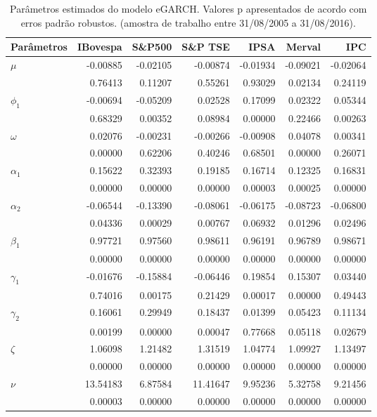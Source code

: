 \begin{table}[H]
\centering
\caption{Par\^ametros estimados do modelo eGARCH. Valores p apresentados 
               de acordo com erros padrão robustos. (amostra de trabalho entre 31/08/2005 a 31/08/2016).} 
\label{tab:garchcoef}
\begin{tabular}{lrrrrrr}
  \hline
Parâmetros & IBovespa & S\&P500 & S\&P TSE & IPSA & Merval & IPC \\ 
  \hline
$\mu$ & -0.00885 & -0.02105 & -0.00874 & -0.01934 & -0.09021 & -0.02064 \\ 
   & 0.76413 & 0.11207 & 0.55261 & 0.93029 & 0.02134 & 0.24119 \\ 
  $\phi_1$ & -0.00694 & -0.05209 & 0.02528 & 0.17099 & 0.02322 & 0.05344 \\ 
   & 0.68329 & 0.00352 & 0.08984 & 0.00000 & 0.22466 & 0.00263 \\ 
  $\omega$ & 0.02076 & -0.00231 & -0.00266 & -0.00908 & 0.04078 & 0.00341 \\ 
   & 0.00000 & 0.62206 & 0.40246 & 0.68501 & 0.00000 & 0.26071 \\ 
  $\alpha_1$ & 0.15622 & 0.32393 & 0.19185 & 0.16714 & 0.12325 & 0.16831 \\ 
   & 0.00000 & 0.00000 & 0.00000 & 0.00003 & 0.00025 & 0.00000 \\ 
  $\alpha_2$ & -0.06544 & -0.13390 & -0.08061 & -0.06175 & -0.08723 & -0.06800 \\ 
   & 0.04336 & 0.00029 & 0.00767 & 0.06932 & 0.01296 & 0.02496 \\ 
  $\beta_1$ & 0.97721 & 0.97560 & 0.98611 & 0.96191 & 0.96789 & 0.98671 \\ 
   & 0.00000 & 0.00000 & 0.00000 & 0.00000 & 0.00000 & 0.00000 \\ 
  $\gamma_1$ & -0.01676 & -0.15884 & -0.06446 & 0.19854 & 0.15307 & 0.03440 \\ 
   & 0.74016 & 0.00175 & 0.21429 & 0.00017 & 0.00000 & 0.49443 \\ 
  $\gamma_2$ & 0.16061 & 0.29949 & 0.18437 & 0.01399 & 0.05423 & 0.11134 \\ 
   & 0.00199 & 0.00000 & 0.00047 & 0.77668 & 0.05118 & 0.02679 \\ 
  $\zeta$ & 1.06098 & 1.21482 & 1.31519 & 1.04774 & 1.09927 & 1.13497 \\ 
   & 0.00000 & 0.00000 & 0.00000 & 0.00000 & 0.00000 & 0.00000 \\ 
  $\nu$ & 13.54183 & 6.87584 & 11.41647 & 9.95236 & 5.32758 & 9.21456 \\ 
   & 0.00003 & 0.00000 & 0.00000 & 0.00000 & 0.00000 & 0.00000 \\ 
   \hline
\end{tabular}
\end{table}
